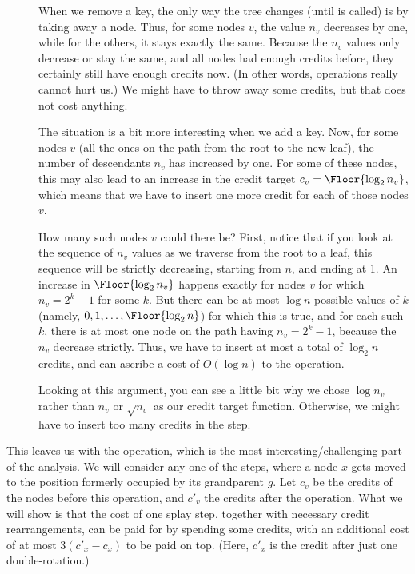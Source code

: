 \begin{description}
\item[] When we remove a key, the only way the tree
  changes (until  is called) is by taking away a node. 
  Thus, for some nodes $v$, the value $n_v$ decreases by one, while
  for the others, it stays exactly the same. Because the $n_v$ values
  only decrease or stay the same, and all nodes had enough credits
  before, they certainly still have enough credits now. (In other
  words,  operations really cannot hurt us.) We might
  have to throw away some credits, but that does not cost anything.
\item[] The situation is a bit more interesting when we add
  a key. Now, for some nodes $v$ (all the ones on the path from the
  root to the new leaf), the number of descendants $n_v$ has increased
  by one. For some of these nodes, this may also lead to an increase
  in the credit target $c_v = \Floor{\log_2 n_v}$, which means that we
  have to insert one more credit for each of those nodes $v$.

  How many such nodes $v$ could there be? First, notice that if you
  look at the sequence of $n_v$ values as we traverse from the root to
  a leaf, this sequence will be strictly decreasing, starting from
  $n$, and ending at 1. An increase in $\Floor{\log_2 n_v}$ happens
  exactly for nodes $v$ for which $n_v = 2^k-1$ for some $k$. 
  But there can be at most $\log n$ possible values of $k$ 
  (namely, $0, 1, \ldots, \Floor{\log_2 n}$) for which this is true,
  and for each such $k$, there is at most one node on the path having
  $n_v = 2^k-1$, because the $n_v$ decrease strictly. Thus, we have to
  insert at most a total of $\log_2 n$ credits, and can ascribe a cost
  of $O(\log n)$ to the  operation.

  Looking at this argument, you can see a little bit why we chose
  $\log n_v$ rather than $n_v$ or $\sqrt{n_v}$ as our credit target
  function. Otherwise, we might have to insert too many credits in the
   step.
\end{description}

This leaves us with the  operation, which is the most
interesting/challenging part of the analysis. 
We will consider any one of the  steps, where a node $x$
gets moved to the position formerly occupied by its grandparent $g$.
Let $c_v$ be the credits of the nodes before this 
operation, and $c'_v$ the credits after the operation.
What we will show is that the cost of one splay step, together with
necessary credit rearrangements, can be paid for by spending some
credits, with an additional cost of at most $3(c'_x-c_x)$ to be paid on
top. (Here, $c'_x$ is the credit after just one double-rotation.)


